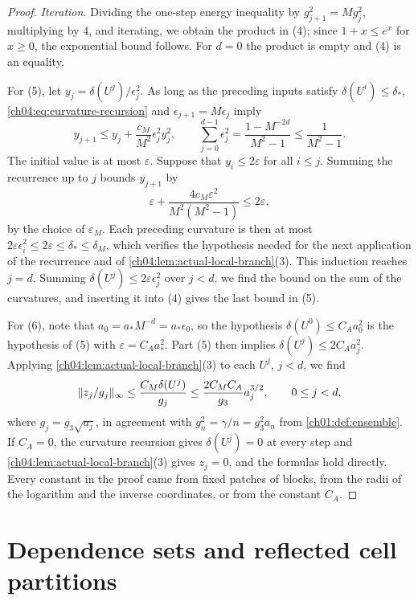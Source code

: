 \begin{proof}
\emph{Iteration.} Dividing the one-step energy inequality by $g_{j+1}^2=Mg_j^2$, multiplying by $4$, and iterating, we obtain the product in (4); since $1+x\le e^x$ for $x\ge0$, the exponential bound follows. For $d=0$ the product is empty and (4) is an equality.

For (5), let $y_j=\delta(U^j)/\epsilon_j^2$. As long as the preceding inputs satisfy $\delta(U^i)\le\delta_*$, \eqref{ch04:eq:curvature-recursion} and $\epsilon_{j+1}=M\epsilon_j$ imply
\begin{equation}\label{ch04:eq:scaled-recurrence}
 y_{j+1}\le y_j+\frac{c_M}{M^2}\epsilon_j^2y_j^2,\qquad\sum_{j=0}^{d-1}\epsilon_j^2=\frac{1-M^{-2d}}{M^2-1}\le\frac1{M^2-1}.
\end{equation}
The initial value is at most $\varepsilon$. Suppose that $y_i\le2\varepsilon$ for all $i\le j$. Summing the recurrence up to $j$ bounds $y_{j+1}$ by
\[
 \varepsilon+\frac{4c_M\varepsilon^2}{M^2(M^2-1)}\le2\varepsilon,
\]
by the choice of $\varepsilon_M$. Each preceding curvature is then at most $2\varepsilon\epsilon_i^2\le2\varepsilon\le\delta_*\le\delta_M$, which verifies the hypothesis needed for the next application of the recurrence and of \cref{ch04:lem:actual-local-branch}(3). This induction reaches $j=d$. Summing $\delta(U^j)\le2\varepsilon\epsilon_j^2$ over $j<d$, we find the bound on the sum of the curvatures, and inserting it into (4) gives the last bound in (5).

For (6), note that $a_0=a_*M^{-d}=a_*\epsilon_0$, so the hypothesis $\delta(U^0)\le C_Aa_0^2$ is the hypothesis of (5) with $\varepsilon=C_Aa_*^2$. Part (5) then implies $\delta(U^j)\le2C_Aa_j^2$. Applying \cref{ch04:lem:actual-local-branch}(3) to each $U^j$, $j<d$, we find
\[
 \lVert z_j/g_j\rVert_\infty\le\frac{C_M\delta(U^j)}{g_j}\le\frac{2C_MC_A}{g_3}a_j^{3/2},\qquad0\le j<d,
\]
where $g_j=g_3\sqrt{a_j}$, in agreement with $g_n^2=\gamma/n=g_3^2a_n$ from \cref{ch01:def:ensemble}. If $C_A=0$, the curvature recursion gives $\delta(U^j)=0$ at every step and \cref{ch04:lem:actual-local-branch}(3) gives $z_j=0$, and the formulas hold directly. Every constant in the proof came from fixed patches of blocks, from the radii of the logarithm and the inverse coordinates, or from the constant $C_A$.
\end{proof}

\section{Dependence sets and reflected cell partitions}\label{ch04:sec:cells}

